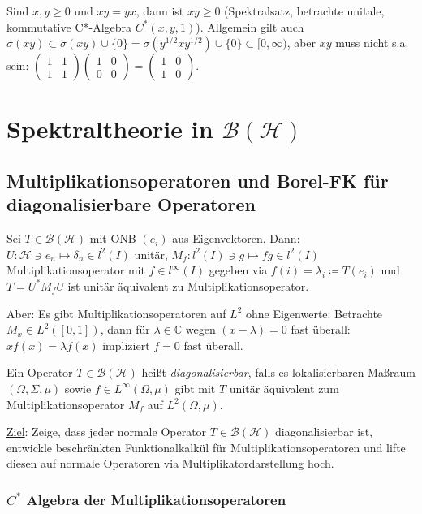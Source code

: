 \documentclass[11pt,a4paper]{scrartcl}
\newcommand{\C}{\mathbb{C}} %
\newcommand{\Hc}{\mathcal{H}}
\newcommand{\B}{\mathcal{B}}
\theoremstyle{plain}
\theoremstyle{definition}
\theoremstyle{remark}
\begin{document}
Sind $x,y \geq 0$ und $xy=yx$, dann ist $xy \geq 0$ (Spektralsatz, betrachte unitale, kommutative C*-Algebra $C^*(x,y,1)$). Allgemein gilt auch $\sigma(xy)\subset \sigma(xy)\cup\{0\}=\sigma(y^{1/2}xy^{1/2})\cup\{0\}\subset [0,\infty)$, aber $xy$ muss nicht s.a. sein: $\left(\begin{smallmatrix} 1 & 1 \\ 1 & 1 \end{smallmatrix}\right)\left(\begin{smallmatrix} 1 & 0 \\ 0 & 0 \end{smallmatrix}\right)=\left(\begin{smallmatrix} 1 & 0 \\ 1 & 0 \end{smallmatrix}\right)$. 

\section{Spektraltheorie in $\B(\Hc)$}

\subsection{Multiplikationsoperatoren und Borel-FK für diagonalisierbare Operatoren}

Sei $T\in \B(\Hc)$ mit ONB $(e_i)$ aus Eigenvektoren. Dann: $U: \Hc \ni e_n \mapsto \delta_n \in l^2(I)$ unitär, $M_f: l^2(I) \ni g \mapsto fg \in l^2(I)$ Multiplikationsoperator mit $f\in l^\infty(I)$ gegeben via $f(i)=\lambda_i\coloneqq T(e_i)$ und $T=U^*M_f U$ ist unitär äquivalent zu Multiplikationsoperator.

Aber: Es gibt Multiplikationsoperatoren auf $L^2$ ohne Eigenwerte: Betrachte $M_x \in L^2([0,1])$, dann für $\lambda\in\C$ wegen $(x-\lambda)=0$ fast überall: $x f(x) = \lambda f(x)$ impliziert $f=0$ fast überall.

Ein Operator $T\in \B(\Hc)$ heißt \emph{diagonalisierbar}, falls es lokalisierbaren Maßraum $(\Omega, \Sigma, \mu)$ sowie $f\in L^\infty(\Omega, \mu)$ gibt mit $T$ unitär äquivalent zum Multiplikationsoperator $M_f$ auf $L^2(\Omega, \mu)$.

\underline{Ziel}: Zeige, dass jeder normale Operator $T\in \B(\Hc)$ diagonalisierbar ist, entwickle beschränkten Funktionalkalkül für Multiplikationsoperatoren und lifte diesen auf normale Operatoren via Multiplikatordarstellung hoch.

\subsubsection{$C^*$ Algebra der Multiplikationsoperatoren}
\end{document}
